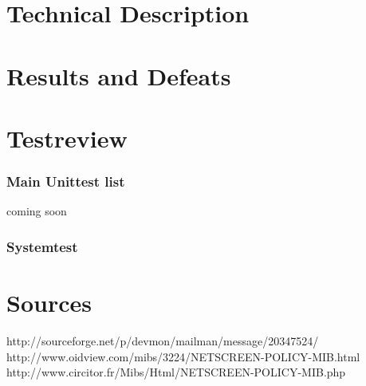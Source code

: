 \documentclass[a4paper,12pt]{scrreprt}
\begin{document}
\chapter{Technical Description}

\chapter{Results and Defeats}


\chapter{Testreview}
\subsection{Main Unittest list}
coming soon\\

\subsection{Systemtest}


\chapter{Sources}
http://sourceforge.net/p/devmon/mailman/message/20347524/
http://www.oidview.com/mibs/3224/NETSCREEN-POLICY-MIB.html
http://www.circitor.fr/Mibs/Html/NETSCREEN-POLICY-MIB.php
\end{document}
